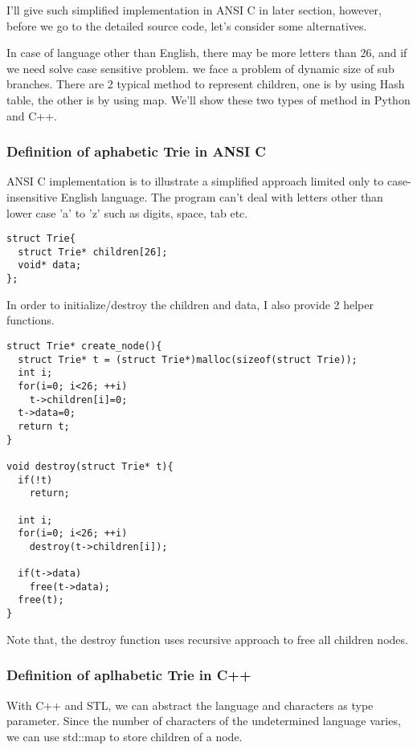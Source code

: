 \documentclass{article}
\begin{document}
I'll give such simplified implementation in ANSI C in later section,
however, before we go to the detailed source code, let's consider some
alternatives. 

In case of language other than English, there may be more letters than 26, 
and if we need
solve case sensitive problem. we face a problem of dynamic size of sub
branches. There are 2 typical method to represent children, one is by
using Hash table, the other is by using map. We'll show these two types
of method in Python and C++.

\subsubsection*{Definition of aphabetic Trie in ANSI C}
ANSI C implementation is to illustrate a simplified approach limited only
to case-insensitive English language. The program can't deal with letters 
other than lower case 'a' to 'z' such as digits, space, tab etc.

\lstset{language=C}
\begin{lstlisting}
struct Trie{
  struct Trie* children[26];
  void* data;
};
\end{lstlisting}

In order to initialize/destroy the children and data, I also provide 2 helper
functions.

\begin{lstlisting}
struct Trie* create_node(){
  struct Trie* t = (struct Trie*)malloc(sizeof(struct Trie));
  int i;
  for(i=0; i<26; ++i)
    t->children[i]=0;
  t->data=0;
  return t;
}

void destroy(struct Trie* t){
  if(!t)
    return;

  int i;
  for(i=0; i<26; ++i)
    destroy(t->children[i]);

  if(t->data)
    free(t->data);
  free(t);
}
\end{lstlisting}

Note that, the destroy function uses recursive approach to free all
children nodes.

\subsubsection*{Definition of aplhabetic Trie in C++}

With C++ and STL, we can abstract the language and characters as type
parameter. Since the number of characters of the undetermined language varies, we
can use std::map to store children of a node.
\end{document}
